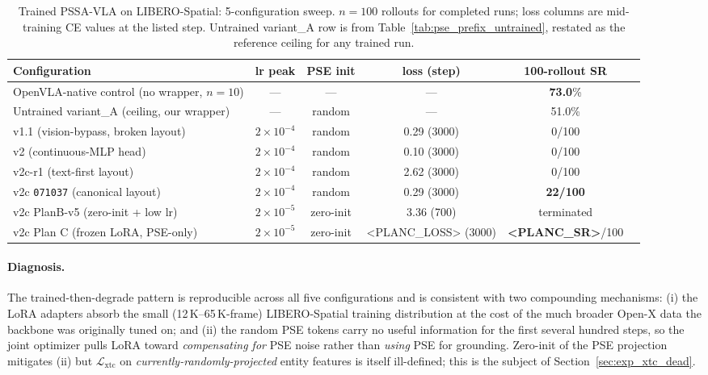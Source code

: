 \documentclass[10pt,letterpaper]{article}
\newcommand{\method}{\textsc{PSSA-VLA}\xspace}
\begin{document}
\begin{table}[t]
\centering
\caption{Trained \method on LIBERO-Spatial: 5-configuration sweep.
$n=100$ rollouts for completed runs; loss columns are mid-training
CE values at the listed step. Untrained variant\_A row is from
Table~\ref{tab:pse_prefix_untrained}, restated as the reference ceiling
for any trained run.}
\label{tab:trained_configs}
\small
\begin{tabular}{lccccc}
\toprule
Configuration & lr peak & PSE init & loss (step) & 100-rollout SR \\
\midrule
OpenVLA-native control (no wrapper, $n{=}10$) & --- & --- & --- & \textbf{73.0}\% \\
Untrained variant\_A (ceiling, our wrapper) & --- & random & --- & 51.0\% \\
\midrule
v1.1 (vision-bypass, broken layout) & $2\!\times\!10^{-4}$ & random & 0.29 (3000) & 0/100 \\
v2 (continuous-MLP head) & $2\!\times\!10^{-4}$ & random & 0.10 (3000) & 0/100 \\
v2c-r1 (text-first layout) & $2\!\times\!10^{-4}$ & random & 2.62 (3000) & 0/100 \\
v2c \texttt{071037} (canonical layout) & $2\!\times\!10^{-4}$ & random & 0.29 (3000) & \textbf{22/100} \\
v2c PlanB-v5 (zero-init + low lr) & $2\!\times\!10^{-5}$ & zero-init & 3.36 (700) & terminated \\
\midrule
v2c Plan C (frozen LoRA, PSE-only) & $2\!\times\!10^{-5}$ & zero-init & <PLANC_LOSS> (3000) & \textbf{<PLANC_SR>}/100 \\
\bottomrule
\end{tabular}
\end{table}

\paragraph{Diagnosis.} The trained-then-degrade pattern is reproducible
across all five configurations and is consistent with two compounding
mechanisms: (i) the LoRA adapters absorb the small (12\,K--65\,K-frame)
LIBERO-Spatial training distribution at the cost of the much broader
Open-X data the backbone was originally tuned on; and
(ii) the random PSE tokens carry no useful information for the first
several hundred steps, so the joint optimizer pulls LoRA toward
\emph{compensating for} PSE noise rather than \emph{using} PSE for
grounding. Zero-init of the PSE projection mitigates (ii) but
$\mathcal{L}_\text{xtc}$ on \emph{currently-randomly-projected} entity
features is itself ill-defined; this is the subject of
Section~\ref{sec:exp_xtc_dead}.
\end{document}
